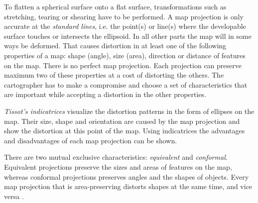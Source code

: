 To flatten a spherical surface onto a flat surface, transformations such as stretching, tearing or shearing have to be performed. %
A map projection is only accurate at the \emph{standard lines}, i.e. the point(s) or line(s) where the developable surface touches or intersects the ellipsoid. In all other parts the map will in some ways be deformed. That causes distortion in at least one of the following properties of a map: shape (angle), size (area),  direction or distance of features on the map. There is no perfect map projection. Each projection can preserve maximum two of these properties at a cost of distorting the others. The cartographer has to make a compromise and choose a set of characteristics that are important while accepting a distortion in the other properties.

\emph{Tissot's indicatrices} visualize the distortion patterns in the form of ellipses on the map. Their size, shape and orientation are caused by the map projection and show the distortion at this point of the map. Using indicatrices the advantages and disadvantages of each map projection can be shown.

There are two mutual exclusive characteristics: \emph{equivalent} and \emph{conformal}. Equivalent projections preserve the sizes and areas of features on the map, whereas conformal projections preserves angles and the shapes of objects. Every map projection that is area-preserving distorts shapes at the same time, and vice versa
\cite{mapProjectionGeokov}.

